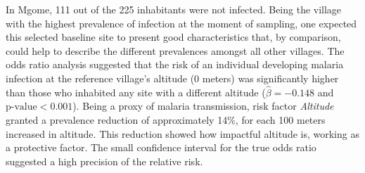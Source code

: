 In Mgome, 111 out of the 225 inhabitants were not infected.
Being the village with the highest prevalence of infection at the moment of sampling, one expected this selected baseline site to present good characteristics that, by comparison, could help to describe the different prevalences amongst all other villages.
The odds ratio analysis suggested that the risk of an individual developing malaria infection at the reference village's altitude (0 meters) was significantly higher than those who inhabited any site with a different altitude ($\hat{\beta}=−0.148$ and $\text{p-value}<0.001$).
Being a proxy of malaria transmission, risk factor \textit{Altitude} granted a prevalence reduction of approximately 14\%, for each 100 meters increased in altitude.
This reduction showed how impactful altitude is, working as a protective factor.
The small confidence interval for the true odds ratio suggested a high precision of the relative risk.

